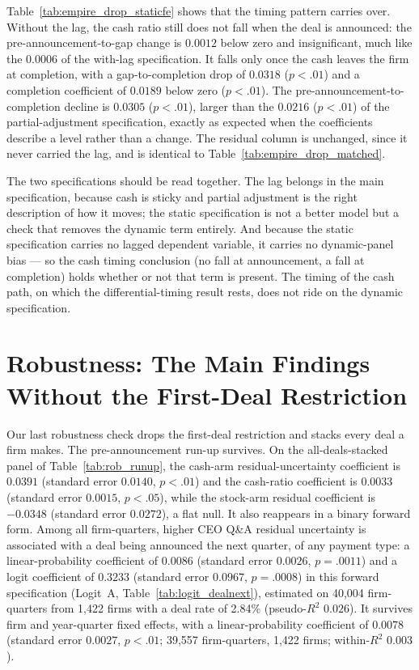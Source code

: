 Table~\ref{tab:empire_drop_staticfe} shows that the timing pattern carries over. Without the lag, the cash ratio still does not fall when the deal is announced: the pre-announcement-to-gap change is $0.0012$ below zero and insignificant, much like the $0.0006$ of the with-lag specification. It falls only once the cash leaves the firm at completion, with a gap-to-completion drop of $0.0318$ ($p<.01$) and a completion coefficient of $0.0189$ below zero ($p<.01$). The pre-announcement-to-completion decline is $0.0305$ ($p<.01$), larger than the $0.0216$ ($p<.01$) of the partial-adjustment specification, exactly as expected when the coefficients describe a level rather than a change. The residual column is unchanged, since it never carried the lag, and is identical to Table~\ref{tab:empire_drop_matched}.

The two specifications should be read together. The lag belongs in the main specification, because cash is sticky and partial adjustment is the right description of how it moves; the static specification is not a better model but a check that removes the dynamic term entirely. And because the static specification carries no lagged dependent variable, it carries no dynamic-panel bias --- so the cash timing conclusion (no fall at announcement, a fall at completion) holds whether or not that term is present. The timing of the cash path, on which the differential-timing result rests, does not ride on the dynamic specification.

\section{Robustness: The Main Findings Without the First-Deal Restriction}

Our last robustness check drops the first-deal restriction and stacks every deal a firm makes. The pre-announcement run-up survives. On the all-deals-stacked panel of Table~\ref{tab:rob_runup}, the cash-arm residual-uncertainty coefficient is $0.0391$ (standard error $0.0140$, $p<.01$) and the cash-ratio coefficient is $0.0033$ (standard error $0.0015$, $p<.05$), while the stock-arm residual coefficient is $-0.0348$ (standard error $0.0272$), a flat null. It also reappears in a binary forward form. Among all firm-quarters, higher CEO Q\&A residual uncertainty is associated with a deal being announced the next quarter, of any payment type: a linear-probability coefficient of $0.0086$ (standard error $0.0026$, $p=.0011$) and a logit coefficient of $0.3233$ (standard error $0.0967$, $p=.0008$) in this forward specification (Logit~A, Table~\ref{tab:logit_dealnext}), estimated on 40,004 firm-quarters from 1,422 firms with a deal rate of 2.84\% (pseudo-$R^2$ $0.026$). It survives firm and year-quarter fixed effects, with a linear-probability coefficient of $0.0078$ (standard error $0.0027$, $p<.01$; 39,557 firm-quarters, 1,422 firms; within-$R^2$ $0.003$).


